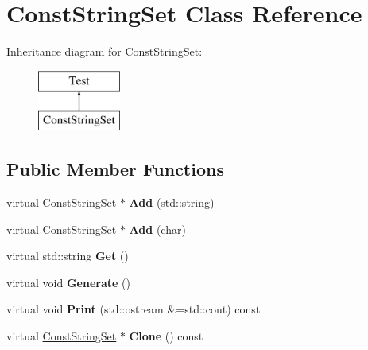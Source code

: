 \hypertarget{class_const_string_set}{}\section{Const\+String\+Set Class Reference}
\label{class_const_string_set}
Inheritance diagram for Const\+String\+Set\+:\begin{figure}[H]
\begin{center}
\leavevmode
\includegraphics[height=2.000000cm]{class_const_string_set}
\end{center}
\end{figure}
\subsection*{Public Member Functions}
\begin{DoxyCompactItemize}
\item 
\mbox{\label{class_const_string_set_acd0a1079f684d1c210738414ed6ba61d}} 
virtual \hyperlink{class_const_string_set}{Const\+String\+Set} $\ast$ {\bfseries Add} (std\+::string)
\item 
\mbox{\label{class_const_string_set_ae4ab97db08d0aaf52a04e3927941cb5d}} 
virtual \hyperlink{class_const_string_set}{Const\+String\+Set} $\ast$ {\bfseries Add} (char)
\item 
\mbox{\label{class_const_string_set_a817a9530b8107ed97250c539d74c5f52}} 
virtual std\+::string {\bfseries Get} ()
\item 
\mbox{\label{class_const_string_set_a5f1fdb968a310f7e7a15295ae05388d4}} 
virtual void {\bfseries Generate} ()
\item 
\mbox{\label{class_const_string_set_a60612742de31f7556c76dd5306e5af92}} 
virtual void {\bfseries Print} (std\+::ostream \&=std\+::cout) const
\item 
\mbox{\label{class_const_string_set_aba9c7cefc8063c338241f52feb007403}} 
virtual \hyperlink{class_const_string_set}{Const\+String\+Set} $\ast$ {\bfseries Clone} () const
\end{DoxyCompactItemize}
